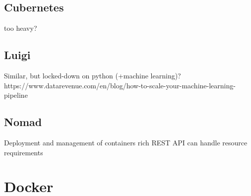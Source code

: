 \subsection{Cubernetes}

too heavy?

\subsection{Luigi}

Similar, but locked-down on python  (+machine learning)?
https://www.datarevenue.com/en/blog/how-to-scale-your-machine-learning-pipeline

\subsection{Nomad}

Deployment and management of containers
rich REST API
can handle resource requirements

\section{Docker}
